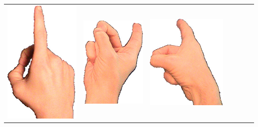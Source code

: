 \documentclass{article}
\begin{document}
\begin{center}
\begin{tabular}{r*{6}{c}}
\includegraphics[scale=0.1]{images/03-10-3.jpg}&
\includegraphics[scale=0.1]{images/03-10-4.jpg}&
\includegraphics[scale=0.1]{images/03-10-5.jpg}&

\end{tabular}
\end{center}
\end{document}
